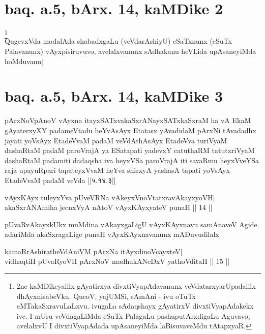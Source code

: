 \section*{baq. a.5, bArx. 14, kaMDike 2}

\stext

\begin{artha} 
\footnote[2]{2ne kaMDikeyalilx gAyatirxya divxtiVyapAdavanunx 
veVdatarxyarUpadalilx dhAyxnisabeVku. QucoV, yajUMSi, sAmAni - ivu 
oTuTx eMTakaSxravuLaLxvu. ivugaLa sAdaqshayx gAyatirxV 
divxtiVyapAdakekx ive. I mUru veVdagaLiMda eSuTx PalagaLu 
pashuputArxdigaLu Aguvavo, avelalxvU I divxtiVyapAdada upAsaneyiMda 
laBisuvaveMdu tAtapxyaR.}\\
QugevxVda modalAda shabadxgaLu (veVdarAshiyU) eSaTxnunx (eSuTx 
Palavanunx) vAyxpisiruvuvo, avelalxvanunx sAdhakanu heVLida 
upAsaneyiMda hoMduvanu||
\end{artha}

\section*{baq. a.5, bArx. 14, kaMDike 3}

\begin{shl}
pArxNoV\s pAnoV vAyxna itayxSATxvakaSxrANayxSATxkaSxraM ha vA EkaM gAyaterxyXY padameVtadu heYvAsAyx Etatasx yAvadidaM pArxNi tAvadadhx jayati yoV\s sAyx EtadeVvaM padaM veVdAthAsAyx EtadeVva turiVyaM dashaRtaM padaM paroVrajA ya ESatapati yadevxY catuthaRM tatutxriVyaM dashaRtaM padamiti dadaqsha iva heyxVSa paroVrajA iti savaRmu heyxVveYSa raja upayuRpari tapateyxVvaM heYva shirxyA yashasA tapati yoV\s sAyx EtadeVvaM padaM veVda ||५.१४.३||
\end{shl}

\stext

\begin{shl}
vAyxKAyx tuleyxYva pUveVRNa vAkeyxVnoVtatxravAkayxyoVH| \\
akaSxrANAmiha jecnxVyA nAtoV vAyxKAyxyateV punaH \hfill ||  14 || 
\end{shl}

\begin{artha} 
pUvaRvAkayxkUkx muMdina vAkayxgaLigU vAyxKAyxnavu samAnaveV Agide. 
adariMda akaSxragaLige punaH vAyxKAyxnavanunx mADuvudilalx||
\end{artha}

\begin{shl}
kamaRrAshiratheVdAniVM pArxNa itAyxdinoVcayxteV| \\
vidhaqtiH pUvaRyoVH pArxNoV madhukANeDxV yathoVditaH \hfill ||  15 || 
\end{shl}

